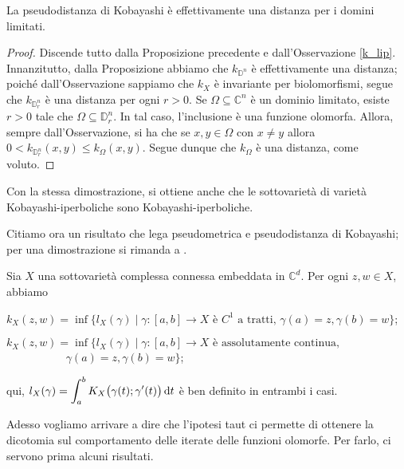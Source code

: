 \begin{cor}
    La pseudodistanza di Kobayashi è effettivamente una distanza per i domini limitati.
\end{cor}
\begin{proof}
    Discende tutto dalla Proposizione precedente e dall'Osservazione \ref{k_lip}. Innanzitutto, dalla Proposizione abbiamo che $k_{\mathbb{D}^n}$ è effettivamente una distanza; poiché dall'Osservazione sappiamo che $k_X$ è invariante per biolomorfismi, segue che $k_{\mathbb{D}_r^n}$ è una distanza per ogni $r>0$. Se $\Omega\subseteq\mathbb{C}^n$ è un dominio limitato, esiste $r>0$ tale che $\Omega\subseteq\mathbb{D}_r^n$. In tal caso, l'inclusione è una funzione olomorfa. Allora, sempre dall'Osservazione, si ha che se $x,y \in \Omega$ con $x\not=y$ allora $0<k_{\mathbb{D}_r^n}(x,y) \le k_{\Omega}(x,y)$. Segue dunque che $k_\Omega$ è una distanza, come voluto.
\end{proof}

\begin{oss}
    Con la stessa dimostrazione, si ottiene anche che le sottovarietà di varietà Kobayashi-iperboliche sono Kobayashi-iperboliche.
\end{oss}

Citiamo ora un risultato che lega pseudometrica e pseudodistanza di Kobayashi; per una dimostrazione si rimanda a \cite{R}.

\begin{thm}
    \cite[Result 2.1]{CMS} Sia $X$ una sottovarietà complessa connessa embeddata in $\mathbb{C}^d$. Per ogni $z,w \in X$, abbiamo
    \begin{nlist}
        \item $k_X(z,w)=\inf\{l_X(\gamma) \mid \gamma:[a,b] \longrightarrow X\text{ è $C^1$ a tratti, }\gamma(a)=z,\gamma(b)=w\}$;
        \item $k_X(z,w)=\inf\{l_X(\gamma) \mid \gamma:[a,b] \longrightarrow X\text{ è assolutamente continua,}$\\
        $\text{    }\qquad\qquad\,\,\,\,\gamma(a)=z,\gamma(b)=w\}$;
    \end{nlist}
    qui, $l_X(\gamma)=\displaystyle\int_a^b K_X\big(\gamma(t);\gamma'(t)\big)\mathop{}\!\mathrm{d} t$ è ben definito in entrambi i casi.
\end{thm}

Adesso vogliamo arrivare a dire che l'ipotesi taut ci permette di ottenere la dicotomia sul comportamento delle iterate delle funzioni olomorfe. Per farlo, ci servono prima alcuni risultati.

